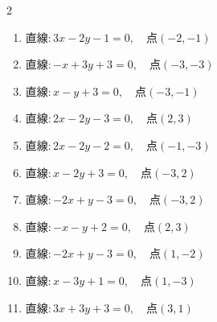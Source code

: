 \begin{multicols}{2}
\begin{enumerate}

  \item $直線:3x-2y-1=0,\quad 点 ( -2, -1 )$


  \item $直線:-x+3y+3=0,\quad 点 ( -3, -3 )$


  \item $直線:x-y+3=0,\quad 点 ( -3, -1 )$


  \item $直線:2x-2y-3=0,\quad 点 ( 2, 3 )$


  \item $直線:2x-2y-2=0,\quad 点 ( -1, -3 )$


  \item $直線:x-2y+3=0,\quad 点 ( -3, 2 )$


  \item $直線:-2x+y-3=0,\quad 点 ( -3, 2 )$


  \item $直線:-x-y+2=0,\quad 点 ( 2, 3 )$


\columnbreak %

\resetques

  \item $直線:-2x+y-3=0,\quad 点 ( 1, -2 )$


  \item $直線:x-3y+1=0,\quad 点 ( 1, -3 )$


  \item $直線:3x+3y+3=0,\quad 点 ( 3, 1 )$


\end{enumerate}
\end{multicols}
